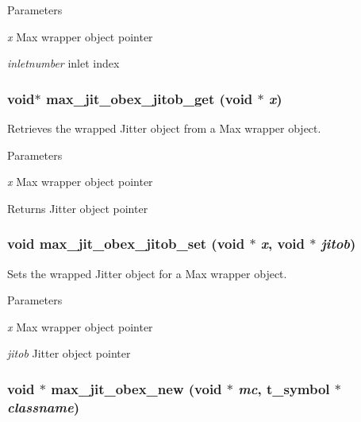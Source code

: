 \begin{DoxyParams}{Parameters}
\item[{\em x}]Max wrapper object pointer \item[{\em inletnumber}]inlet index \end{DoxyParams}
\hypertarget{group__maxwrapmod_ga063ab88bfc92c1a666f3ad6251834e20}{
\subsubsection[{max\_\-jit\_\-obex\_\-jitob\_\-get}]{\setlength{\rightskip}{0pt plus 5cm}void$\ast$ max\_\-jit\_\-obex\_\-jitob\_\-get (void $\ast$ {\em x})}}
\label{group__maxwrapmod_ga063ab88bfc92c1a666f3ad6251834e20}


Retrieves the wrapped Jitter object from a Max wrapper object. 
\begin{DoxyParams}{Parameters}
\item[{\em x}]Max wrapper object pointer\end{DoxyParams}
\begin{DoxyReturn}{Returns}
Jitter object pointer 
\end{DoxyReturn}
\hypertarget{group__maxwrapmod_gaa1b174cf92680ca46bfb189a812d2a65}{
\subsubsection[{max\_\-jit\_\-obex\_\-jitob\_\-set}]{\setlength{\rightskip}{0pt plus 5cm}void max\_\-jit\_\-obex\_\-jitob\_\-set (void $\ast$ {\em x}, \/  void $\ast$ {\em jitob})}}
\label{group__maxwrapmod_gaa1b174cf92680ca46bfb189a812d2a65}


Sets the wrapped Jitter object for a Max wrapper object. 
\begin{DoxyParams}{Parameters}
\item[{\em x}]Max wrapper object pointer \item[{\em jitob}]Jitter object pointer \end{DoxyParams}
\hypertarget{group__maxwrapmod_gacf7fc6f3f87db8515f61b12efbcc9073}{
\subsubsection[{max\_\-jit\_\-obex\_\-new}]{\setlength{\rightskip}{0pt plus 5cm}void $\ast$ max\_\-jit\_\-obex\_\-new (void $\ast$ {\em mc}, \/  {\bf t\_\-symbol} $\ast$ {\em classname})}}
\label{group__maxwrapmod_gacf7fc6f3f87db8515f61b12efbcc9073}


